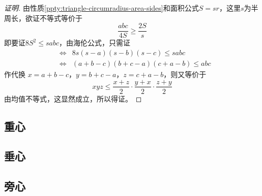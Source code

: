 \begin{proof}[证明]
  由性质\ref{ppty:triangle-circumradius-area-sides}和面积公式$S=sr$，这里$s$为半周长，欲证不等式等价于
  \begin{equation*}
    \frac{abc}{4S} \geqslant \frac{2S}{s}
  \end{equation*}
  即要证$8S^2 \leqslant sabc$，由海伦公式，只需证
  \begin{eqnarray*}
    & \Longleftrightarrow & 8s(s-a)(s-b)(s-c) \leqslant sabc \\
    & \Longleftrightarrow & (a+b-c)(b+c-a)(c+a-b) \leqslant abc
  \end{eqnarray*}
  作代换 $x=a+b-c$，$y=b+c-a$，$z=c+a-b$，则又等价于
  \begin{equation*}
    xyz \leqslant \frac{x+z}{2} \cdot \frac{y+x}{2} \cdot \frac{z+y}{2}
  \end{equation*}
  由均值不等式，这显然成立，所以得证。
\end{proof}

\subsection{重心}
\label{sec:triangle-centroid}

\subsection{垂心}
\label{sec:triangle-orthocentre}

\subsection{旁心}
\label{sec:escenter}



